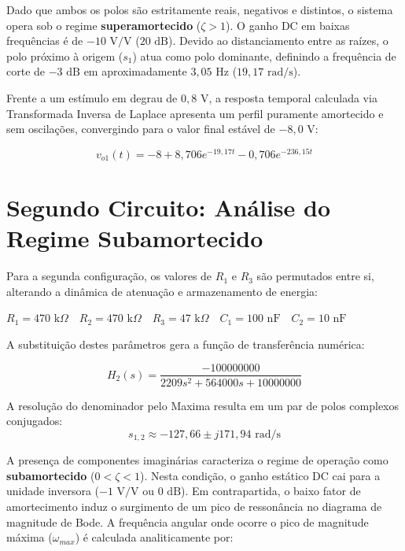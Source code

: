 Dado que ambos os polos são estritamente reais, negativos e distintos, o sistema opera sob o regime \textbf{superamortecido} ($\zeta > 1$). O ganho DC em baixas frequências é de $-10\text{ V/V}$ ($20\text{ dB}$). Devido ao distanciamento entre as raízes, o polo próximo à origem ($s_1$) atua como polo dominante, definindo a frequência de corte de $-3\text{ dB}$ em aproximadamente $3,05\text{ Hz}$ ($19,17\text{ rad/s}$). 

Frente a um estímulo em degrau de $0,8\text{ V}$, a resposta temporal calculada via Transformada Inversa de Laplace apresenta um perfil puramente amortecido e sem oscilações, convergindo para o valor final estável de $-8,0\text{ V}$:

\begin{equation}
	v_{o1}(t) = -8 + 8,706e^{-19,17t} - 0,706e^{-236,15t}
\end{equation}

\section{Segundo Circuito: Análise do Regime Subamortecido}

Para a segunda configuração, os valores de $R_1$ e $R_3$ são permutados entre si, alterando a dinâmica de atenuação e armazenamento de energia:
\begin{center}
	$R_1 = 470\text{ k}\Omega \quad R_2 = 470\text{ k}\Omega \quad R_3 = 47\text{ k}\Omega \quad C_1 = 100\text{ nF} \quad C_2 = 10\text{ nF}$
\end{center}

A substituição destes parâmetros gera a função de transferência numérica:

\begin{equation}
	H_2(s) = \frac{-100000000}{2209s^2 + 564000s + 10000000}
\end{equation}

A resolução do denominador pelo Maxima resulta em um par de polos complexos conjugados:
\begin{equation}
	s_{1,2} \approx -127,66 \pm j171,94\text{ rad/s}
	\label{eq:polos_complexos}
\end{equation}

A presença de componentes imaginárias caracteriza o regime de operação como \textbf{subamortecido} ($0 < \zeta < 1$). Nesta condição, o ganho estático DC cai para a unidade inversora ($-1\text{ V/V}$ ou $0\text{ dB}$). Em contrapartida, o baixo fator de amortecimento induz o surgimento de um pico de ressonância no diagrama de magnitude de Bode. A frequência angular onde ocorre o pico de magnitude máxima ($\omega_{max}$) é calculada analiticamente por:

